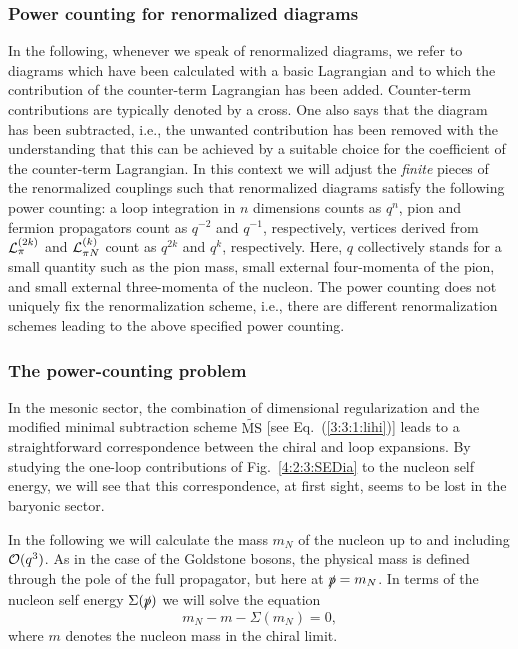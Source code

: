\documentclass[twoside,12pt]{article}
\begin{document}
\subsubsection{Power counting for renormalized diagrams}
\label{subsection_pcrd}
   In the following, whenever we speak of renormalized diagrams, we refer to
diagrams which have been calculated with a basic Lagrangian and to which the
contribution of the counter-term Lagrangian has been added.
   Counter-term contributions are typically denoted by a cross.
   One also says that the diagram has been subtracted, i.e., the unwanted
contribution has been removed with the understanding that this
can be achieved by a suitable choice for the coefficient of the
counter-term Lagrangian.
   In this context we will adjust the {\em finite} pieces of the renormalized
couplings such that renormalized diagrams satisfy the following power counting:
   a loop integration in $n$ dimensions counts as $q^n$,
pion and fermion propagators count as $q^{-2}$ and $q^{-1}$,
respectively, vertices derived from ${\cal L}_{\pi}^{(2k)}$ and
${\cal L}_{\pi N}^{(k)}$ count as $q^{2k}$ and $q^k$, respectively.
   Here, $q$ collectively stands for a small quantity such as the pion
   mass, small external four-momenta of the pion, and small external
three-momenta of the nucleon.
   The power counting does not uniquely fix the renormalization scheme,
i.e., there are different renormalization schemes leading to the
above specified power counting.

\subsubsection{The power-counting problem}
   In the mesonic sector, the combination of dimensional regularization and
the modified minimal subtraction scheme $\widetilde{\mbox{MS}}$
[see Eq.~(\ref{3:3:1:lihi})] leads to a straightforward correspondence between
the chiral and loop expansions.
   By studying the one-loop contributions of Fig.\ \ref{4:2:3:SEDia} to the
nucleon self energy, we will see that this correspondence, at first sight,
seems to be lost in the baryonic sector.

   In the following we will calculate the mass $m_N$ of the nucleon up to and
including ${\cal O}(q^3)$.
   As in the case of the Goldstone bosons, the physical mass is defined through
the pole of the full propagator, but here at $\slashed{p}=m_N$.
   In terms of the nucleon self energy $\Sigma(\slashed{p})$ we will solve the equation
\begin{equation}
\label{4:2:3:MassDef}
m_N-m-\Sigma(m_N)=0,
\end{equation}
where $m$ denotes the nucleon mass in the chiral limit.
\end{document}
